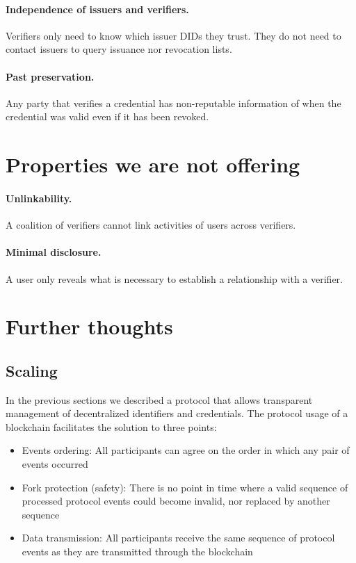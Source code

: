 \documentclass[10pt,a4paper]{article}
\begin{document}
\paragraph{Independence of issuers and verifiers.} Verifiers only need to know which issuer DIDs they trust. They do not need to contact issuers to query issuance nor revocation lists.
\paragraph{Past preservation.} Any party that verifies a credential has non-reputable information of when the credential was valid even if it has been revoked.

\section{Properties we are not offering}

\paragraph{Unlinkability.} A coalition of verifiers cannot link activities of users across verifiers.
\paragraph{Minimal disclosure.} A user only reveals what is necessary to establish a relationship with a verifier.


\section{Further thoughts}

\subsection{Scaling} 

In the previous sections we described a protocol that allows transparent management of decentralized identifiers and credentials.
The protocol usage of a blockchain facilitates the solution to three points:
\begin{itemize}
\item Events ordering: All participants can agree on the order in which any pair of events occurred 
\item Fork protection (safety): There is no point in time where a valid sequence of processed protocol events could become invalid, nor replaced by 
      another sequence
\item Data transmission: All participants receive the same sequence of protocol events as they are transmitted through the blockchain
\end{itemize}
\end{document}
